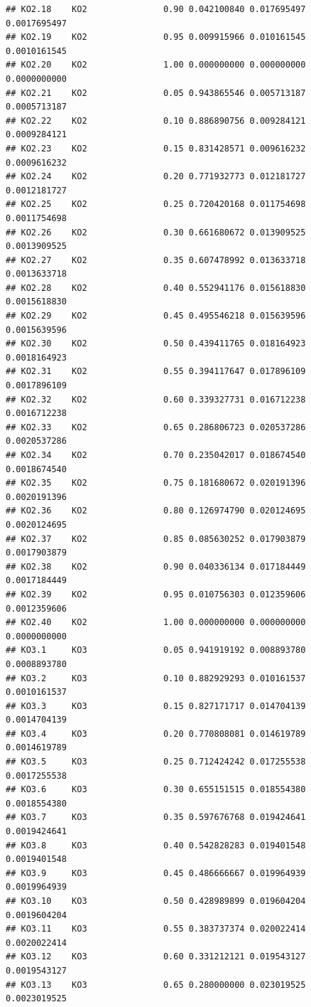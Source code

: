 \documentclass[
]{book}
\begin{document}
\begin{verbatim}
## KO2.18    KO2               0.90 0.042100840 0.017695497 0.0017695497
## KO2.19    KO2               0.95 0.009915966 0.010161545 0.0010161545
## KO2.20    KO2               1.00 0.000000000 0.000000000 0.0000000000
## KO2.21    KO2               0.05 0.943865546 0.005713187 0.0005713187
## KO2.22    KO2               0.10 0.886890756 0.009284121 0.0009284121
## KO2.23    KO2               0.15 0.831428571 0.009616232 0.0009616232
## KO2.24    KO2               0.20 0.771932773 0.012181727 0.0012181727
## KO2.25    KO2               0.25 0.720420168 0.011754698 0.0011754698
## KO2.26    KO2               0.30 0.661680672 0.013909525 0.0013909525
## KO2.27    KO2               0.35 0.607478992 0.013633718 0.0013633718
## KO2.28    KO2               0.40 0.552941176 0.015618830 0.0015618830
## KO2.29    KO2               0.45 0.495546218 0.015639596 0.0015639596
## KO2.30    KO2               0.50 0.439411765 0.018164923 0.0018164923
## KO2.31    KO2               0.55 0.394117647 0.017896109 0.0017896109
## KO2.32    KO2               0.60 0.339327731 0.016712238 0.0016712238
## KO2.33    KO2               0.65 0.286806723 0.020537286 0.0020537286
## KO2.34    KO2               0.70 0.235042017 0.018674540 0.0018674540
## KO2.35    KO2               0.75 0.181680672 0.020191396 0.0020191396
## KO2.36    KO2               0.80 0.126974790 0.020124695 0.0020124695
## KO2.37    KO2               0.85 0.085630252 0.017903879 0.0017903879
## KO2.38    KO2               0.90 0.040336134 0.017184449 0.0017184449
## KO2.39    KO2               0.95 0.010756303 0.012359606 0.0012359606
## KO2.40    KO2               1.00 0.000000000 0.000000000 0.0000000000
## KO3.1     KO3               0.05 0.941919192 0.008893780 0.0008893780
## KO3.2     KO3               0.10 0.882929293 0.010161537 0.0010161537
## KO3.3     KO3               0.15 0.827171717 0.014704139 0.0014704139
## KO3.4     KO3               0.20 0.770808081 0.014619789 0.0014619789
## KO3.5     KO3               0.25 0.712424242 0.017255538 0.0017255538
## KO3.6     KO3               0.30 0.655151515 0.018554380 0.0018554380
## KO3.7     KO3               0.35 0.597676768 0.019424641 0.0019424641
## KO3.8     KO3               0.40 0.542828283 0.019401548 0.0019401548
## KO3.9     KO3               0.45 0.486666667 0.019964939 0.0019964939
## KO3.10    KO3               0.50 0.428989899 0.019604204 0.0019604204
## KO3.11    KO3               0.55 0.383737374 0.020022414 0.0020022414
## KO3.12    KO3               0.60 0.331212121 0.019543127 0.0019543127
## KO3.13    KO3               0.65 0.280000000 0.023019525 0.0023019525

\end{verbatim}
\end{document}
